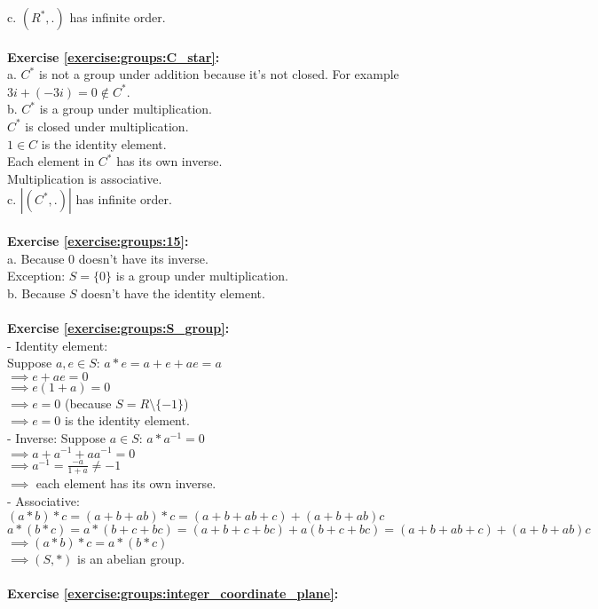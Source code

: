 c. $(R^*,.)$ has infinite order.\\
\\
\textbf{Exercise \ref{exercise:groups:C_star}:}\\
a. $C^*$ is not a group under addition because it's not closed. For example $3i+(-3i)=0\not\in C^*$.\\
b. $C^*$ is a group under multiplication.\\
$C^*$ is closed under multiplication.\\
$1\in C$ is the identity element.\\
Each element in $C^*$ has its own inverse.\\
Multiplication is associative.\\
c. $|(C^*,.)|$ has infinite order.\\
\\
\textbf{Exercise \ref{exercise:groups:15}:}\\
a. Because 0 doesn't have its inverse.\\
Exception: $S=\{0\}$ is a group under multiplication.\\
b. Because $S$ doesn't have the identity element.\\
\\
\textbf{Exercise \ref{exercise:groups:S_group}:}\\
- Identity element:\\
Suppose $a,e\in S$: $a*e=a+e+ae=a$\\
$\implies e+ae=0$\\
$\implies e(1+a)=0$\\
$\implies e=0$ (because $S=R\setminus\{-1\}$)\\
$\implies e=0$ is the identity element.\\
- Inverse: Suppose $a\in S$: $a*a^{-1}=0$\\
$\implies a+a^{-1}+aa^{-1}=0$\\
$\implies a^{-1}=\displaystyle\frac{-a}{1+a}\neq -1$\\
$\implies$  each element has its own inverse.\\
- Associative:\\
$(a*b)*c=(a+b+ab)*c=(a+b+ab+c)+(a+b+ab)c$\\
$a*(b*c)=a*(b+c+bc)=(a+b+c+bc)+a(b+c+bc)=(a+b+ab+c)+(a+b+ab)c$\\
$\implies (a*b)*c=a*(b*c)$\\
$\implies (S,*)$ is an abelian group.\\
\\
\textbf{Exercise \ref{exercise:groups:integer_coordinate_plane}:}\\
